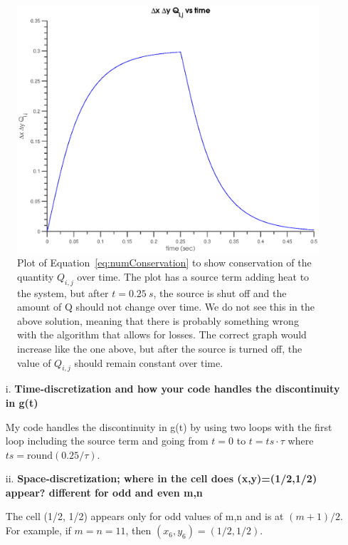 \begin{enumerate}
	\begin{figure}
		[htbp] \centering 
		\includegraphics[width=\MyWidth]{Figures/deltaConservationPlot.eps} \caption{Plot of Equation~\eqref{eq:numConservation} to show conservation of the quantity $Q_{i,j}$ over time. The plot has a source term adding heat to the system, but after $t=0.25~s$, the source is shut off and the amount of Q should not change over time. We do not see this in the above solution, meaning that there is probably something wrong with the algorithm that allows for losses. The correct graph would increase like the one above, but after the source is turned off, the value of $Q_{i,j}$ should remain constant over time.} \label{fig:Figures_deltaConservationPlot} 
	\end{figure}
	
	\begin{itemize}
		\item[i.] \textbf{Time-discretization and how your code handles the discontinuity in g(t)}
		
		{\color{blue} My code handles the discontinuity in g(t) by using two loops with the first loop including the source term and going from $t=0$ to $t= ts \cdot \tau$ where $ts=\mathrm{round}(0.25/\tau)$.} 
		\item[ii.] \textbf{Space-discretization; where in the cell does (x,y)=(1/2,1/2) appear? different for odd and even m,n}
		
		{\color{blue} The cell (1/2, 1/2) appears only for odd values of m,n and is at $(m+1)/2$. For example, if $m=n=11$, then $(x_{6},y_{6}) = (1/2,1/2)$.} 
	\end{itemize}
\end{enumerate}

